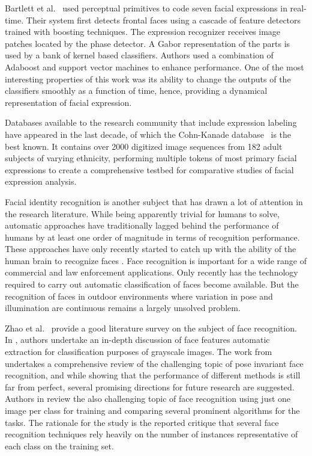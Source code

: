 \documentclass[]{article}
\begin{document}
Bartlett et al.~\cite{Bartlett4624313} used perceptual primitives to code seven facial expressions in real-time. Their system
first detects frontal faces using a cascade of feature detectors trained with boosting techniques. The expression
recognizer receives image patches located by the phase detector. A Gabor representation of the parts is used  by a bank
of kernel based classifiers. Authors used a combination of Adaboost and support vector machines to enhance performance.
One of the most interesting properties of this work was its ability to change the outputs of the classifiers smoothly
as a function of time, hence, providing a dynamical representation of facial expression.

Databases available to the research community that include expression labeling have appeared in the last decade, of
which the Cohn-Kanade database~\cite{Cohn840611} is the best known. It contains over 2000 digitized image sequences from  182
adult subjects of varying ethnicity, performing multiple tokens of most primary facial expressions to create a
comprehensive testbed for comparative studies of facial expression analysis.


Facial identity recognition is another subject that has drawn a lot of attention in the research literature. While being
apparently trivial for humans to solve, automatic approaches have traditionally lagged behind the performance of humans
by at least one order of magnitude in terms of recognition performance. These approaches have only recently started to
catch up with the ability of the human brain to recognize faces \cite{onintelligence, Rozado2012b}. Face recognition is
important  for a wide range of commercial and law enforcement applications. Only recently has the technology required to
carry out automatic classification of faces become available. But the recognition of faces in outdoor environments 
where variation in pose and illumination are continuous remains a largely unsolved problem.


Zhao et al.~\cite{Zhao:2003} provide a good literature survey on the subject of face recognition. In
\cite{Craw1987183}, authors undertake an in-depth discussion of face features automatic extraction for classification
purposes of grayscale images. The work from \cite{Zhang20092876} undertakes a comprehensive review  of the challenging
topic of pose invariant face recognition, and while showing that the performance of different methods is still far from
perfect, several promising directions for future research  are suggested. Authors in \cite{Tan20061725} review the also
challenging topic of face recognition using  just one image per class for training and comparing several prominent
algorithms for the tasks. The rationale for the study is the reported critique that several face recognition techniques
rely heavily on the number of instances representative of each class on the training set.
\end{document}

